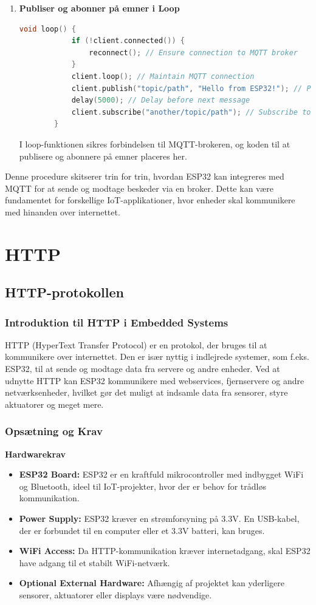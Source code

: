 \begin{enumerate}
	\item \textbf{Publiser og abonner på emner i Loop}
	\begin{lstlisting}[language=C++, caption=Syntaks]
		void loop() {
			if (!client.connected()) {
				reconnect(); // Ensure connection to MQTT broker
			}
			client.loop(); // Maintain MQTT connection
			client.publish("topic/path", "Hello from ESP32!"); // Publish a message
			delay(5000); // Delay before next message
			client.subscribe("another/topic/path"); // Subscribe to a topic
		}
	\end{lstlisting}
	I loop-funktionen sikres forbindelsen til MQTT-brokeren, og koden til at publisere og abonnere på emner placeres her.
\end{enumerate}
Denne procedure skitserer trin for trin, hvordan ESP32 kan integreres med MQTT for at sende og modtage beskeder via en broker. Dette kan være fundamentet for forskellige IoT-applikationer, hvor enheder skal kommunikere med hinanden over internettet.

\chapter{HTTP}
\section{HTTP-protokollen}

\subsection*{Introduktion til HTTP i Embedded Systems}
HTTP (HyperText Transfer Protocol) er en protokol, der bruges til at kommunikere over internettet. Den er især nyttig i indlejrede systemer, som f.eks. ESP32, til at sende og modtage data fra servere og andre enheder. Ved at udnytte HTTP kan ESP32 kommunikere med webservices, fjernservere og andre netværksenheder, hvilket gør det muligt at indsamle data fra sensorer, styre aktuatorer og meget mere.

\subsection*{Opsætning og Krav}

\textbf{Hardwarekrav}
\begin{itemize}
	\item \textbf{ESP32 Board:} ESP32 er en kraftfuld mikrocontroller med indbygget WiFi og Bluetooth, ideel til IoT-projekter, hvor der er behov for trådløs kommunikation.
	\item \textbf{Power Supply:} ESP32 kræver en strømforsyning på 3.3V. En USB-kabel, der er forbundet til en computer eller et 3.3V batteri, kan bruges.
	\item \textbf{WiFi Access:} Da HTTP-kommunikation kræver internetadgang, skal ESP32 have adgang til et stabilt WiFi-netværk.
	\item \textbf{Optional External Hardware:} Afhængig af projektet kan yderligere sensorer, aktuatorer eller displays være nødvendige.
\end{itemize}

